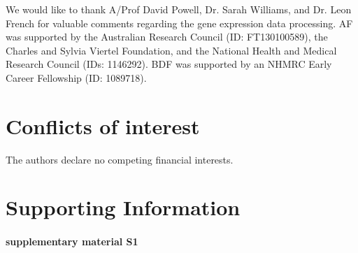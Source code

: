 \documentclass[10pt,A4]{article}
\newcommand{\beginsupplement}{%
        \setcounter{table}{0}
        \renewcommand{\thetable}{S\arabic{table}}%
        \setcounter{figure}{0}
        \renewcommand{\thefigure}{S\arabic{figure}}%
     }
\begin{document}
We would like to thank A/Prof David Powell, Dr. Sarah Williams, and Dr. Leon French for valuable comments regarding the gene expression data processing.
AF was supported by the Australian Research Council (ID: FT130100589), the Charles and Sylvia Viertel Foundation, and the National Health and Medical Research Council (IDs: 1146292).
BDF was supported by an NHMRC Early Career Fellowship (ID: 1089718).

\section*{Conflicts of interest}
The authors declare no competing financial interests.

\newpage



\newpage
\beginsupplement
\section*{Supporting Information}

\paragraph*{supplementary material S1}\mbox{}\\
\label{SItext1}
\end{document}
